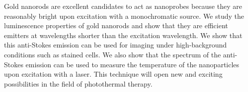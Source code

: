 Gold nanorods are excellent candidates to act as nanoprobes because they are
reasonably bright upon excitation with a monochromatic source. We study the
luminescence properties of gold nanorods and show that they are efficient
emitters at wavelengths shorter than the excitation wavelength. We show that
this anti-Stokes emission can be used for imaging under high-background
conditions such as stained cells. We also show that the spectrum of the
anti-Stokes emission can be used to measure the temperature of the nanoparticles
upon excitation with a laser. This technique will open new and exciting
possibilities in the field of photothermal therapy.
